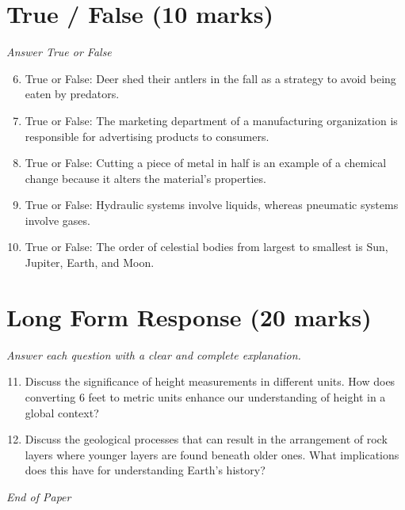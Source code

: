 \documentclass[12pt]{article}
\begin{document}
\section*{True / False (10 marks)}
\textit{Answer True or False}
\begin{enumerate}[label=\arabic*.]
\setcounter{enumi}{5}
\item True or False: Deer shed their antlers in the fall as a strategy to avoid being eaten by predators.
\item True or False: The marketing department of a manufacturing organization is responsible for advertising products to consumers.
\item True or False: Cutting a piece of metal in half is an example of a chemical change because it alters the material's properties.
\item True or False: Hydraulic systems involve liquids, whereas pneumatic systems involve gases.
\item True or False: The order of celestial bodies from largest to smallest is Sun, Jupiter, Earth, and Moon.
\end{enumerate}

\section*{Long Form Response (20 marks)}
\textit{Answer each question with a clear and complete explanation.}
\begin{enumerate}[label=\arabic*.]
\setcounter{enumi}{10}
\item Discuss the significance of height measurements in different units. How does converting 6 feet to metric units enhance our understanding of height in a global context?
\item Discuss the geological processes that can result in the arrangement of rock layers where younger layers are found beneath older ones. What implications does this have for understanding Earth's history?
\end{enumerate}

\vfill
\noindent\textit{End of Paper}
\end{document}

